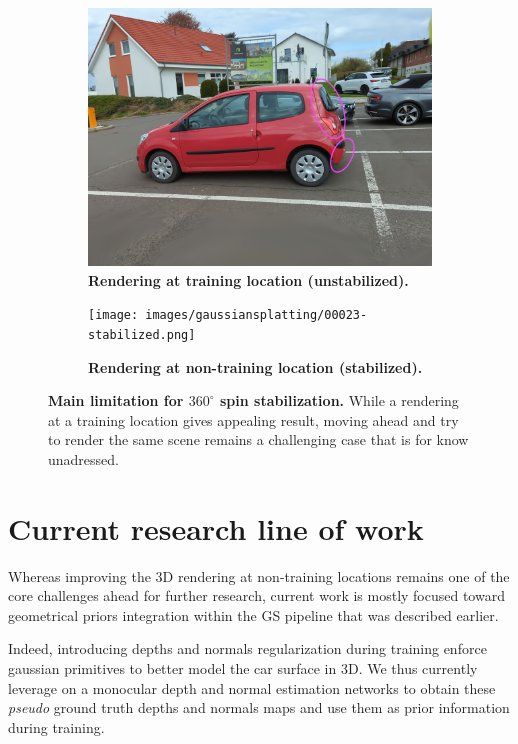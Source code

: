 \begin{figure}[htb!]
  \centering
  \begin{subfigure}[b]{0.45\linewidth}
    \includegraphics[width=\linewidth]{images/gaussiansplatting/00023-unstabilized.png}
    \caption{\textbf{Rendering at training location (unstabilized).}}
  \end{subfigure}
  \quad %
  \begin{subfigure}[b]{0.45\linewidth}
    \texttt{[image: images/gaussiansplatting/00023-stabilized.png]}
    \caption{\textbf{Rendering at non-training location (stabilized).}}
  \end{subfigure}
  \caption{\textbf{Main limitation for $360^{\circ}$ spin stabilization.} While a rendering at a training location gives appealing result, moving ahead and try to render the same scene remains a challenging case that is for know unadressed.}
  \label{fig:nontraining-rendering}
\end{figure}

\section{Current research line of work}

Whereas improving the 3D rendering at non-training locations remains one of the core challenges ahead for further research, current work is mostly focused toward geometrical priors integration within the \ac{GS} pipeline that was described earlier. 

Indeed, introducing depths and normals regularization during training enforce gaussian primitives to better model the car surface in 3D. 
We thus currently leverage on a monocular depth \citep{ke2023repurposing,yang2024depth} and normal \citep{bae2024rethinking,ye2024stablenormal} estimation networks to obtain these \textit{pseudo} ground truth depths and normals maps and use them as prior information during training. 

